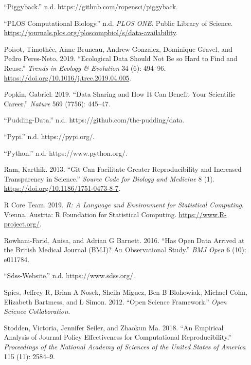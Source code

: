 \documentclass[
]{article}
\newlength{\cslhangindent}
\newenvironment{cslreferences}%
  {\setlength{\parindent}{0pt}%
  \everypar{\setlength{\hangindent}{\cslhangindent}}\ignorespaces}%
  {\par}
\begin{document}
\begin{cslreferences}
\leavevmode\hypertarget{ref-piggyback}{}%
``Piggyback.'' n.d. https://github.com/ropensci/piggyback.

\leavevmode\hypertarget{ref-plos-comp-bio-data}{}%
``PLOS Computational Biology.'' n.d. \emph{PLOS ONE}. Public Library of Science. \url{https://journals.plos.org/ploscompbiol/s/data-availability}.

\leavevmode\hypertarget{ref-Poisot2019}{}%
Poisot, Timothée, Anne Bruneau, Andrew Gonzalez, Dominique Gravel, and Pedro Peres-Neto. 2019. ``Ecological Data Should Not Be so Hard to Find and Reuse.'' \emph{Trends in Ecology \& Evolution} 34 (6): 494--96. \url{https://doi.org/10.1016/j.tree.2019.04.005}.

\leavevmode\hypertarget{ref-Popkin2019}{}%
Popkin, Gabriel. 2019. ``Data Sharing and How It Can Benefit Your Scientific Career.'' \emph{Nature} 569 (7756): 445--47.

\leavevmode\hypertarget{ref-pudding-data}{}%
``Pudding-Data.'' n.d. https://github.com/the-pudding/data.

\leavevmode\hypertarget{ref-pypi}{}%
``Pypi.'' n.d. https://pypi.org/.

\leavevmode\hypertarget{ref-python}{}%
``Python.'' n.d. https://www.python.org/.

\leavevmode\hypertarget{ref-Ram2013}{}%
Ram, Karthik. 2013. ``Git Can Facilitate Greater Reproducibility and Increased Transparency in Science.'' \emph{Source Code for Biology and Medicine} 8 (1). \url{https://doi.org/10.1186/1751-0473-8-7}.

\leavevmode\hypertarget{ref-rcore}{}%
R Core Team. 2019. \emph{R: A Language and Environment for Statistical Computing}. Vienna, Austria: R Foundation for Statistical Computing. \url{https://www.R-project.org/}.

\leavevmode\hypertarget{ref-Rowhani-Farid2016}{}%
Rowhani-Farid, Anisa, and Adrian G Barnett. 2016. ``Has Open Data Arrived at the British Medical Journal (BMJ)? An Observational Study.'' \emph{BMJ Open} 6 (10): e011784.

\leavevmode\hypertarget{ref-sdss-website}{}%
``Sdss-Website.'' n.d. https://www.sdss.org/.

\leavevmode\hypertarget{ref-OSF}{}%
Spies, Jeffrey R, Brian A Nosek, Sheila Miguez, Ben B Blohowiak, Michael Cohn, Elizabeth Bartmess, and L Simon. 2012. ``Open Science Framework.'' \emph{Open Science Collaboration}.

\leavevmode\hypertarget{ref-Stodden2018}{}%
Stodden, Victoria, Jennifer Seiler, and Zhaokun Ma. 2018. ``An Empirical Analysis of Journal Policy Effectiveness for Computational Reproducibility.'' \emph{Proceedings of the National Academy of Sciences of the United States of America} 115 (11): 2584--9.


\end{cslreferences}
\end{document}
